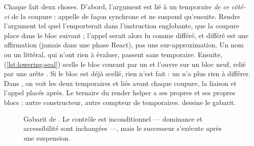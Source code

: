 

Chaque  fait deux choses. D'abord, l'argument est lié à un temporaire \emph{de ce côté-ci} de la coupure :  appelle  de façon synchrone et ne suspend qu'ensuite. Rendre l'argument tel quel l'emporterait dans l'instruction englobante, que la coupure place dans le bloc suivant ; l'appel serait alors lu comme \og différé\fg{}, et \og différé\fg{} est une affirmation (\og jamais dans une phase React\fg{}), pas une sur-approximation. Un nom ou un littéral, qui n'ont rien à évaluer, passent sans temporaire. Ensuite,  (\cref{lst:lowering-seal}) scelle le bloc courant par un  et l'ouvre sur un bloc neuf, relié par une arête . Si le bloc est déjà scellé, rien n'est fait : un  n'a plus rien à différer. Dans , on voit les deux temporaires  et  liés avant chaque coupure, la liaison  et l'appel  placés après. Le ternaire du render helper  a ses propres  et ses propres blocs : autre constructeur, autre compteur de temporaires.  dessine le gabarit.

\begin{figure}[htbp]\centering
{}
\caption{Gabarit de . Le contrôle est inconditionnel --- dominance et accessibilité sont inchangées ---, mais le successeur s'exécute après une suspension.}\label{fig:lowering-await}
\end{figure}

